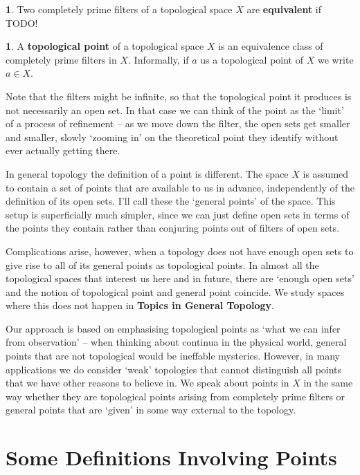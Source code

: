 \documentclass[oneside,english]{amsbook}
\numberwithin{section}{chapter}
\theoremstyle{plain}
\theoremstyle{definition}
\newtheorem{defn}[thm]{\protect\definitionname}
\providecommand{\definitionname}{Definition}
\begin{document}
\begin{defn} 
	Two completely prime filters of a topological space $X$ are \textbf{equivalent} if TODO!
\end{defn} 

\begin{defn} 
	A \textbf{topological point} of a topological space $X$ is an equivalence class of completely prime filters in $X$. Informally, if $a$ us a topological point of $X$ we write $a \in X$.
\end{defn} 

Note that the filters might be infinite, so that the topological point it produces is not necessarily an open set. In that case we can think of the point as the `limit' of a process of refinement -- as we move down the filter, the open sets get smaller and smaller, slowly `zooming in' on the theoretical point they identify without ever actually getting there.

In general topology the definition of a point is different. The space $X$ is assumed to contain a set of points that are available to us in advance, independently of the definition of its open sets. I'll call these the `general points' of the space. This setup is superficially much simpler, since we can just define open sets in terms of the points they contain rather than conjuring points out of filters of open sets.

	Complications arise, however, when a topology does not have enough open sets to give rise to all of its general points as topological points. In almost all the topological spaces that interest us here and in future, there are `enough open sets' and the notion of topological point and general point coincide. We study spaces where this does not happen in \textbf{Topics in General Topology}.

Our approach is based on emphasising topological points as `what we can infer from observation' -- when thinking about continua in the physical world, general points that are not topological would be ineffable mysteries. However, in many applications we do consider `weak' topologies that cannot distinguish all points that we have other reasons to believe in. We speak about points in $X$ in the same way whether they are topological points arising from completely prime filters or general points that are `given' in some way external to the topology.

\section{Some Definitions Involving Points}
\end{document}
